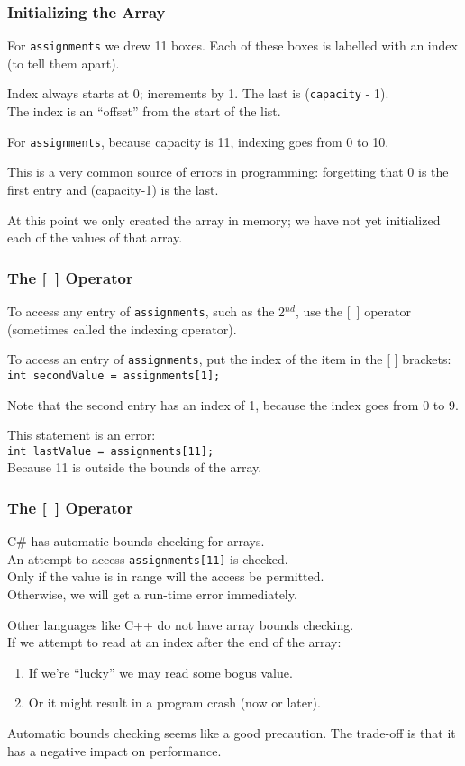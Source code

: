 \begin{frame}
\frametitle{Initializing the Array}

For \texttt{assignments} we drew 11 boxes. Each of these boxes is labelled with an index (to tell them apart).

Index always starts at 0; increments by 1. The last is (\texttt{capacity} - 1).\\
\quad The index is an ``offset'' from the start of the list.

For \texttt{assignments}, because capacity is 11, indexing goes from 0 to 10.

This is a very common source of errors in programming: forgetting that 0 is the first entry and (capacity-1) is the last.

At this point we only created the array in memory; we have not yet initialized each of the values of that array.

\end{frame}

\begin{frame}
\frametitle{The [~] Operator}

To access any entry of \texttt{assignments}, such as the  2$^{nd}$, use the [~] operator (sometimes called the \alert{indexing operator}).

To access an entry of \texttt{assignments}, put the index of the item in the [ ] brackets: \texttt{int secondValue = assignments[1];}

Note that the second entry has an index of 1, because the index goes from 0 to 9.

This statement is an error:\\
\texttt{int lastValue = assignments[11];}\\
\quad Because 11 is outside the bounds of the array.

\end{frame}

\begin{frame}
\frametitle{The [~] Operator}

C\# has automatic bounds checking for arrays.\\
\quad An attempt to access \texttt{assignments[11]} is checked.\\
\quad Only if the value is in range will the access be permitted.\\
\quad Otherwise, we will get a run-time error immediately.

Other languages like C++ do not have array bounds checking.\\
\quad If we attempt to read at an index after the end of the array:\\
\begin{enumerate}
	\item If we're ``lucky'' we may read some bogus value.\\
	\item Or it might result in a program crash (now or later).
\end{enumerate}

Automatic bounds checking seems like a good precaution. The trade-off is that it has a negative impact on performance.

\end{frame}


